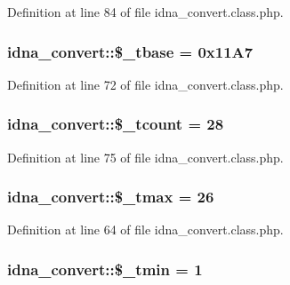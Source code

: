 Definition at line 84 of file idna\-\_\-convert.\-class.\-php.

\hypertarget{classidna__convert_a5b728e6ff6e15773c914383a66651826}{
\subsubsection[{\$\-\_\-tbase}]{\setlength{\rightskip}{0pt plus 5cm}idna\-\_\-convert\-::\$\-\_\-tbase = 0x11\-A7\hspace{0.3cm}{\ttfamily [protected]}}}\label{classidna__convert_a5b728e6ff6e15773c914383a66651826}


Definition at line 72 of file idna\-\_\-convert.\-class.\-php.

\hypertarget{classidna__convert_a81a70a95e18fde08ec6633f0095c92c6}{
\subsubsection[{\$\-\_\-tcount}]{\setlength{\rightskip}{0pt plus 5cm}idna\-\_\-convert\-::\$\-\_\-tcount = 28\hspace{0.3cm}{\ttfamily [protected]}}}\label{classidna__convert_a81a70a95e18fde08ec6633f0095c92c6}


Definition at line 75 of file idna\-\_\-convert.\-class.\-php.

\hypertarget{classidna__convert_a44dfb166546f087150aa6c1ffdde2473}{
\subsubsection[{\$\-\_\-tmax}]{\setlength{\rightskip}{0pt plus 5cm}idna\-\_\-convert\-::\$\-\_\-tmax = 26\hspace{0.3cm}{\ttfamily [protected]}}}\label{classidna__convert_a44dfb166546f087150aa6c1ffdde2473}


Definition at line 64 of file idna\-\_\-convert.\-class.\-php.

\hypertarget{classidna__convert_a25ba1aab448cedd1159da1a09fb97720}{
\subsubsection[{\$\-\_\-tmin}]{\setlength{\rightskip}{0pt plus 5cm}idna\-\_\-convert\-::\$\-\_\-tmin = 1\hspace{0.3cm}{\ttfamily [protected]}}}\label{classidna__convert_a25ba1aab448cedd1159da1a09fb97720}


